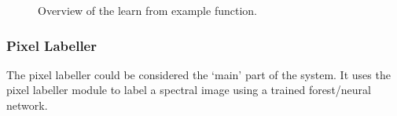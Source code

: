 \documentclass[12pt,twoside,notitlepage]{report}
\begin{document}
\begin{figure}[H]
{\begin{tikzpicture}[node distance=2cm,>=stealth',bend angle=45,auto]
                                    
                            \end{tikzpicture}
                        }

                    \caption{Overview of the learn from example function.}
                \end{figure} 




            \subsubsection{Pixel Labeller}
                The pixel labeller could be considered the `main' part of the system. It uses the pixel labeller 
                module to label a spectral image using a trained forest/neural network.
\end{document}
